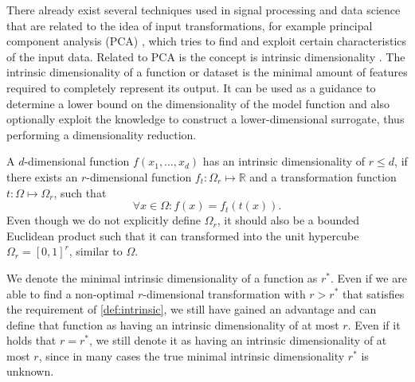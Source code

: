 \documentclass[
  a4paper,  %
  twoside,  %
  bibliography=totoc,
  headsepline,
  cleardoublepage=empty,
  parskip=half,
  draft=false
]{scrbook}
\begin{document}
There already exist several techniques used in signal processing and data science that are related to the idea of input transformations, for example principal component analysis (PCA) \cite{Abdi2010}, which tries to find and exploit certain characteristics of the input data.
Related to PCA is the concept is intrinsic dimensionality \cite{Bennett1969}.
The intrinsic dimensionality of a function or dataset is the minimal amount of features required to completely represent its output.
It can be used as a guidance to determine a lower bound on the dimensionality of the model function and also optionally exploit the knowledge to construct a lower-dimensional surrogate, thus performing a dimensionality reduction.

\begin{definition}
A $d$-dimensional function $f(x_1, \dots, x_d)$ has an intrinsic dimensionality of $r \leq d$, if there exists an $r$-dimensional function $f_t \colon  \Omega_r \mapsto \mathds{R}$ and a transformation function $t \colon \Omega \mapsto \Omega_r$, such that
\begin{equation}
\forall x \in \Omega \colon f(x)=f_t(t(x)).
\end{equation}
\label{def:intrinsic}
Even though we do not explicitly define $\Omega_r$, it should also be a bounded Euclidean product such that it can  transformed into the unit hypercube $\Omega_r=[0,1]^r$, similar to $\Omega$.
\end{definition}
%
We denote the minimal intrinsic dimensionality of a function as $r^\ast$.
Even if we are able to find a non-optimal $r$-dimensional transformation with $r > r^\ast$ that satisfies the requirement of \cref{def:intrinsic}, we still have gained an advantage and can define that function as having an intrinsic dimensionality of at most $r$.
Even if it holds that $r=r^\ast$, we still denote it as having an intrinsic dimensionality of at most $r$, since in many cases the true minimal intrinsic dimensionality $r^\ast$ is unknown.
\end{document}
